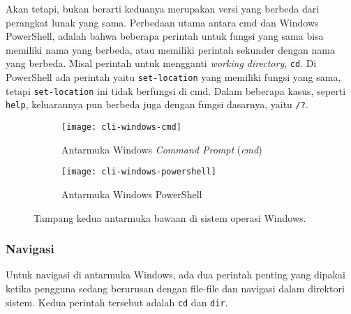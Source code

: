 Akan tetapi, bukan berarti keduanya merupakan versi yang berbeda dari perangkat lunak yang sama. Perbedaan utama antara cmd dan Windows PowerShell, adalah bahwa beberapa perintah untuk fungsi yang sama bisa memiliki nama yang berbeda, atau memiliki perintah sekunder dengan nama yang berbeda. Misal perintah untuk mengganti \textit{working directory}, \verb|cd|. Di PowerShell ada perintah yaitu \verb|set-location| yang memiliki fungsi yang sama, tetapi \verb|set-location| ini tidak berfungsi di cmd. Dalam beberapa kasus, seperti \verb|help|, keluarannya pun berbeda juga dengan fungsi dasarnya, yaitu \verb|/?|.
\newpage\vspace*{-3em}  %
\begin{figure}[ht]
    \begin{subfigure}[b]{0.495\linewidth}
		\centering
		\texttt{[image: cli-windows-cmd]}
		\caption{Antarmuka Windows \textit{Command Prompt} (\textit{cmd})}
		\label{fig:commandline-windows-types-cmd}
	\end{subfigure}
	\hfill
    \begin{subfigure}[b]{0.495\linewidth}
		\centering
		\texttt{[image: cli-windows-powershell]}
		\caption{Antarmuka Windows PowerShell}
		\label{fig:commandline-windows-types-powershell}
	\end{subfigure}
    \caption{Tampang kedua antarmuka \cl\xspace bawaan di sistem operasi Windows.}
	\label{fig:commandline-windows-types}
\end{figure}

\subsubsection{Navigasi}
\label{sec:commandline-windows-nav}

Untuk navigasi di antarmuka \cl\xspace Windows, ada dua perintah penting yang dipakai ketika pengguna sedang berurusan dengan file-file dan navigasi dalam direktori sistem. Kedua perintah tersebut adalah \verb|cd| dan \verb|dir|.

